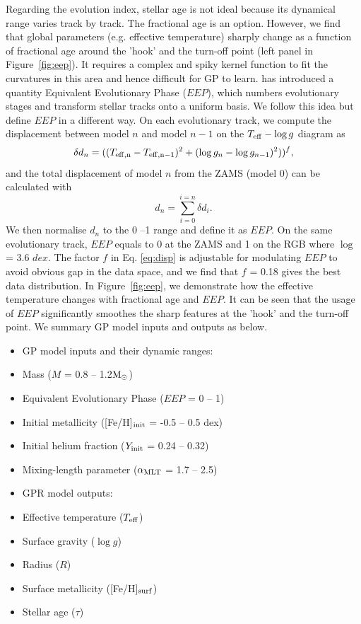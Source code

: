 Regarding the evolution index, stellar age is not ideal because its dynamical range varies track by track. The fractional age is an option. However, we find that global parameters (e.g. effective temperature) sharply change as a function of fractional age around the 'hook' and the turn-off point (left panel in Figure~\ref{fig:eep}). It requires a complex and spiky kernel function to fit the curvatures in this area and hence difficult for GP to learn. \citet{2016ApJS..222....8D} has introduced a quantity Equivalent Evolutionary Phase ($EEP$), which numbers evolutionary stages and transform stellar tracks onto a uniform basis. We follow this idea but define $EEP$ in a different way.
%
On each evolutionary track, we compute the displacement between model $n$ and model $n-1$ on the $T_{\rm eff} - \log g$ diagram as
\begin{equation}\label{eq:disp}
\delta d_{n} = ((T_{\rm eff, n} - T_{\rm eff, n-1}) ^{2} + (\log g _{n} - \log g_{n-1})^{2}))^{f},
\end{equation}
and the total displacement of model $n$ from the ZAMS (model 0) can be calculated with
\begin{equation}
d_{n} = \sum_{i = 0}^{i = n} \delta d_{i} .
\end{equation}
We then normalise $d_{n}$ to the 0 --1 range and define it as $EEP$. On the same evolutionary track, $EEP$ equals to 0 at the ZAMS and 1 on the RGB where $\log$ = 3.6 $dex$. The factor $f$ in Eq. \ref{eq:disp} is adjustable for modulating $EEP$ to avoid obvious gap in the data space, and we find that $f$ = 0.18 gives the best data distribution.
%
In Figure~\ref{fig:eep}, we demonstrate how the effective temperature changes with fractional age and $EEP$. It can be seen that the usage of $EEP$ significantly smoothes the sharp features at the 'hook' and the turn-off point.
We summary GP model inputs and outputs as below.
\begin{itemize}
\item GP model inputs and their dynamic ranges:
\item[] Mass ($M$ = 0.8 -- 1.2$\rm M_{\odot}$)
\item[] Equivalent Evolutionary Phase ($EEP$ = 0 -- 1)
\item[] Initial metallicity ([Fe/H]$_{\rm init}$ =  -0.5 -- 0.5 dex)
\item[] Initial helium fraction ($Y_{\rm init}$ = 0.24 -- 0.32)
\item[] Mixing-length parameter ($\alpha_{\rm MLT}$ = 1.7 -- 2.5)
\item GPR model outputs: 
\item[] Effective temperature ($T_{\rm eff}$) 
\item[] Surface gravity ($\log g$)
\item[] Radius ($R$)
\item[] Surface metallicity ([Fe/H]$_{\rm surf}$)
\item[] Stellar age ($\tau$)
\end{itemize}
